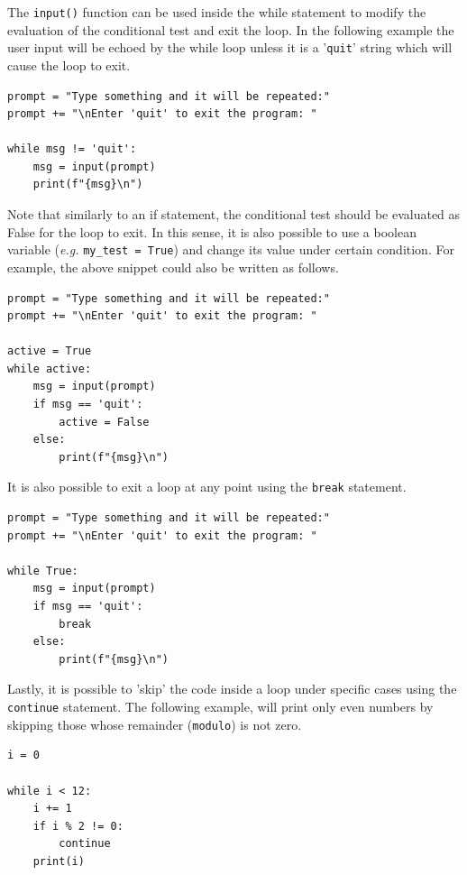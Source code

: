 \documentclass[10pt]{book}
\begin{document}
The \texttt{input()} function can be used inside the while statement to modify the evaluation of the conditional test and exit the loop. In the following example the user input will be echoed by the while loop unless it is a '\texttt{quit}' string which will cause the loop to exit.

\label{orgd918837}
\begin{verbatim}
prompt = "Type something and it will be repeated:"
prompt += "\nEnter 'quit' to exit the program: "

while msg != 'quit':
    msg = input(prompt)
    print(f"{msg}\n") 
\end{verbatim}

Note that similarly to an if statement, the conditional test should be evaluated as False for the loop to exit. In this sense, it is also possible to use a boolean variable (\emph{e.g.} \texttt{my\_test = True}) and change its value under certain condition. For example, the above snippet could also be written as follows.

\label{org250d9a5}
\begin{verbatim}
prompt = "Type something and it will be repeated:"
prompt += "\nEnter 'quit' to exit the program: "

active = True
while active:
    msg = input(prompt)
    if msg == 'quit':
        active = False
    else:
        print(f"{msg}\n") 
\end{verbatim}

It is also possible to exit a loop at any point using the \texttt{break} statement.

\label{orgf837617}
\begin{verbatim}
prompt = "Type something and it will be repeated:"
prompt += "\nEnter 'quit' to exit the program: "

while True:
    msg = input(prompt)
    if msg == 'quit':
        break
    else:
        print(f"{msg}\n") 
\end{verbatim}

Lastly, it is possible to 'skip' the code inside a loop under specific cases using the \texttt{continue} statement. The following example, will print only even numbers by skipping those whose remainder (\texttt{modulo}) is not zero.

\label{org99cbc71}
\begin{verbatim}
i = 0

while i < 12:
    i += 1
    if i % 2 != 0:
        continue
    print(i)
\end{verbatim}
\end{document}
